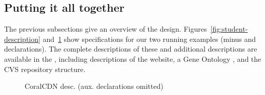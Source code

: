 \subsection{Putting it all together}

The previous subsections give an overview of the \forest{} design.
Figures~\ref{fig:student-description}
and~\ref{fig:coral-description} show \forest{} specifications
for our two running examples (minus \padshaskell{} and \haskell{}
declarations).  The complete descriptions of these \filestores{}
and additional descriptions are available in the \auxmaterials,
including descriptions of the \pads{} website, a Gene Ontology
\filestore{}, and the CVS repository structure. 

\begin{figure}

\caption{\forest{} CoralCDN desc. (aux. declarations omitted)}
\label{fig:coral-description}
\end{figure}
